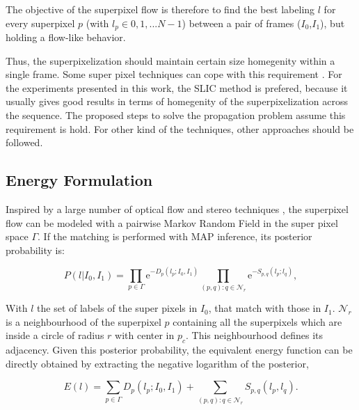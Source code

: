 The objective of the superpixel flow is therefore to find the best labeling $l$ for every superpixel $p$
(with $l_p \in {0,1,...N-1}$) between a pair of frames ($I_{0}$,$I_{1}$), but holding a flow-like behavior.

Thus, the superpixelization should maintain certain size homegenity within a single frame. Some super
pixel techniques can cope with this requirement \cite{c9}\cite{c10}. For the experiments presented 
in this work, the SLIC method \cite{c9} is prefered, because it usually gives
good results in terms of homegenity of the superpixelization across the sequence. 
The proposed steps to solve the propagation problem assume this requirement is hold. 
For other kind of the techniques, other approaches should be followed.


\subsection{Energy Formulation}

Inspired by a large number of optical flow and stereo techniques \cite{c7}\cite{c12}\cite{c13}, 
the superpixel flow can be modeled with a pairwise Markov Random Field in the super pixel space $\Gamma$. If
the matching is performed with MAP inference, its posterior probability is: 

\begin{equation}
P(l|I_0,I_1) = \displaystyle \prod_{p \in \Gamma} \mathrm{e}^{-D_p(l_p;I_0,I_1)} 
\prod_{(p,q): q \in \mathcal{N}_r} \mathrm{e}^{-S_{p,q}(l_p;l_q)} ,
\label{eq_prob}
\end{equation}

With $l$ the set of labels of the super pixels in $I_0$,
that match with those in $I_1$.
$ \mathcal{N}_r $ is a neighbourhood of the
superpixel $p$ containing all the superpixels which are inside a circle of radius $r$ with center in $p_c$. This neighbourhood defines its adjacency. 
Given this posterior probability, the equivalent energy function can be directly obtained
by extracting the negative logarithm of the posterior,

\begin{equation}
E(l) = \displaystyle \sum_{p \in \Gamma} D_p(l_p;I_0,I_1) +
\sum_{(p,q): q \in \mathcal{N}_r} S_{p,q}(l_p,l_q) .
\label{eq_energy}
\end{equation}

